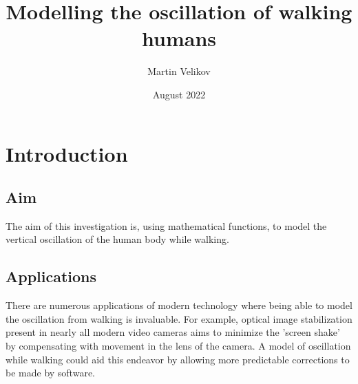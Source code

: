 \documentclass[12pt, a4paper, twoside]{article}
\title{Modelling the oscillation of walking humans}
\author{Martin Velikov}
\date{August 2022}
\begin{document}
\maketitle
\tableofcontents

\section{Introduction}
\subsection{Aim}
The aim of this investigation is, using mathematical functions, to model the
vertical oscillation of the human body while walking.

\subsection{Applications}
There are numerous applications of modern technology where being able to model the
oscillation from walking is invaluable. For example, optical image stabilization
present in nearly all modern video cameras aims to minimize the 'screen shake' by 
compensating with movement in the lens of the camera. A model of oscillation while
walking could aid this endeavor by allowing more predictable corrections to be made
by software.
\end{document}

